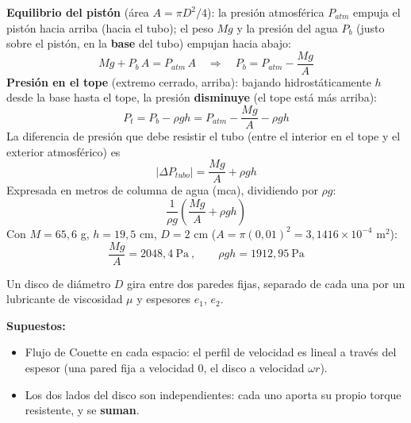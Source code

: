 \documentclass[11pt]{article}
\newenvironment{supuestos}{%
  \noindent\textbf{Supuestos:}
  \begin{itemize}[leftmargin=1.4em, itemsep=1pt]
}{%
  \end{itemize}
}
\begin{document}
\textbf{Equilibrio del pist\'on} (\'area $A=\pi D^2/4$): la presi\'on atmosf\'erica
$P_{atm}$ empuja el pist\'on hacia arriba (hacia el tubo); el peso $Mg$ y la presi\'on
del agua $P_b$ (justo sobre el pist\'on, en la \textbf{base} del tubo) empujan hacia
abajo:
\begin{equation}
Mg+P_b\,A=P_{atm}\,A
\quad\Longrightarrow\quad
P_b=P_{atm}-\frac{Mg}{A}
\end{equation}
\textbf{Presi\'on en el tope} (extremo cerrado, arriba): bajando hidrost\'aticamente
$h$ desde la base hasta el tope, la presi\'on \textbf{disminuye} (el tope est\'a m\'as
arriba):
\begin{equation}
P_t=P_b-\rho g h=P_{atm}-\frac{Mg}{A}-\rho g h
\end{equation}
La diferencia de presi\'on que debe resistir el tubo (entre el interior en el tope y el
exterior atmosf\'erico) es
\begin{equation}
|\Delta P_{tubo}|=\frac{Mg}{A}+\rho g h
\end{equation}
Expresada en metros de columna de agua (mca), dividiendo por $\rho g$:
\begin{equation}
\frac{1}{\rho g}\left(\frac{Mg}{A}+\rho g h\right)
\end{equation}
Con $M=65{,}6$ g, $h=19{,}5$ cm, $D=2$ cm ($A=\pi(0{,}01)^2=3{,}1416\times10^{-4}$
m$^2$):
\begin{equation}
\frac{Mg}{A}=2048{,}4\ \text{Pa}\ ,\qquad \rho g h=1912{,}95\ \text{Pa}
\end{equation}
\begin{center}
\end{center}

\newpage
{}

\noindent Un disco de di\'ametro $D$ gira entre dos paredes fijas, separado de cada una
por un lubricante de viscosidad $\mu$ y espesores $e_1$, $e_2$.

\begin{supuestos}
\item Flujo de Couette en cada espacio: el perfil de velocidad es lineal a trav\'es del
espesor (una pared fija a velocidad 0, el disco a velocidad $\omega r$).
\item Los dos lados del disco son independientes: cada uno aporta su propio torque
resistente, y se \textbf{suman}.
\end{supuestos}
\end{document}
